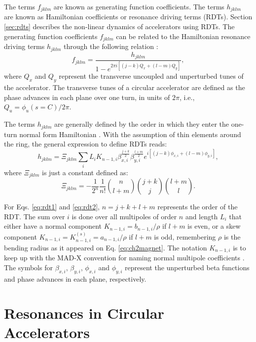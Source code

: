 The terms $f_{jklm}$ are known as generating function coefficients. The terms $h_{jklm}$ are known as Hamiltonian coefficients or resonance driving terms (RDTs). Section \ref{sec:rdts} describes the non-linear dynamics of accelerators using RDTs. The generating function coefficients $f_{jklm}$ can be related to the Hamiltonian resonance driving terms $h_{jklm}$ through the following relation \cite{cernthesis1,bartolini}:
\begin{equation}
    \label{eq:handf}
    f_{jklm}=\frac{h_{jklm}}{1-e^{2\pi i \left[ \left( j-k \right) Q_x + \left( l-m\right) Q_y \right] }},
\end{equation}
where $Q_x$ and $Q_y$ represent the transverse uncoupled and unperturbed tunes of the accelerator. The transverse tunes of a circular accelerator are defined as the phase advances in each plane over one turn, in units of $2\pi$, i.e., $Q_u=\phi_u(s=C)/2\pi$. 

The terms $h_{jklm}$ are generally defined by the order in which they enter the one-turn normal form Hamiltonian \cite{bartolini}. With the assumption of thin elements around the ring, the general expression to define RDTs reads:
\begin{equation}
    \label{eq:rdt1}
    h_{jklm}=\Xi _{jklm} \sum_i L_i K_{n-1,i} \beta_{x,i}^{\frac{j+k}{2}} \beta_{y,i}^{\frac{l+m}{2}} e^{i\left[ (j-k)\phi_{x,i} +(l-m) \phi_{y,i} \right]},
\end{equation}
where $\Xi _{jklm}$ is just a constant defined as:
\begin{equation}
    \label{eq:rdt2}
    \Xi _{jklm} = -\frac{1}{2^n}\frac{1}{n!} {\binom{n}{l+m}} {\binom{j+k}{j}}{\binom{l+m}{l}}.
\end{equation}

For Eqs. \ref{eq:rdt1} and \ref{eq:rdt2}, $n=j+k+l+m$ represents the order of the RDT. The sum over $i$ is done over all multipoles of order $n$ and length $L_i$ that either have a normal component $K_{n-1,i}=b_{n-1,i}/\rho$ if $l+m$ is even, or a skew component $K_{n-1,i}= K_{n-1,i}^{(s)}= a_{n-1,i}/\rho$ if $l+m$ is odd, remembering $\rho$ is the bending radius as it appeared on Eq. \ref{eq:ch2magnet}. The notation $K_{n-1,i}$ is to keep up with the MAD-X convention for naming normal multipole coefficients \cite{madx}. The symbols for $\beta_{x,i}$, $\beta_{y,i}$, $\phi_{x,i}$ and $\phi_{y,i}$ represent the unperturbed beta functions and phase advances in each plane, respectively.

\section{\label{sec:resonances}Resonances in Circular Accelerators}

